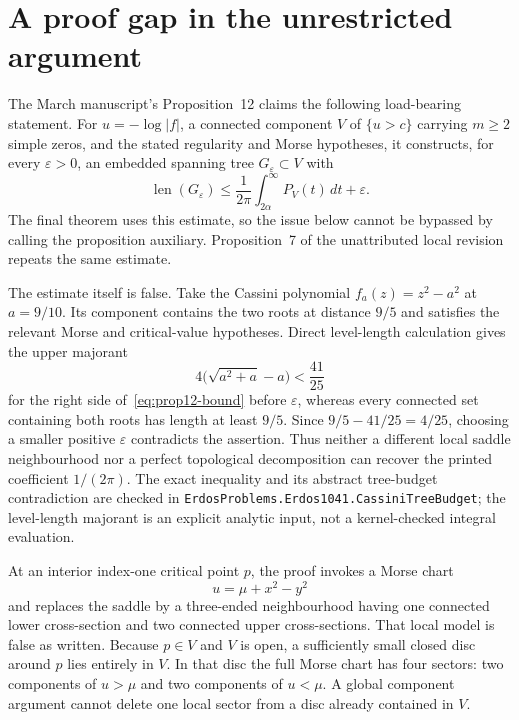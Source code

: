 \documentclass[11pt]{article}
\begin{document}
\section{A proof gap in the unrestricted argument}\label{sec:gap}

The March manuscript's Proposition~12 claims the following load-bearing
statement.  For $u=-\log|f|$, a connected component $V$ of $\{u>c\}$ carrying
$m\ge2$ simple zeros, and the stated regularity and Morse hypotheses, it
constructs, for every $\varepsilon>0$, an embedded spanning tree
$G_\varepsilon\subset V$ with
\[
 \operatorname{len}(G_\varepsilon)
 \le\frac1{2\pi}\int_{2\alpha}^{\infty}P_V(t)\,dt+\varepsilon.
\tag{5.1}\label{eq:prop12-bound}
\]
The final theorem uses this estimate, so the issue below cannot be bypassed by
calling the proposition auxiliary.  Proposition~7 of the unattributed local
revision repeats the same estimate.

The estimate itself is false.  Take the Cassini polynomial
$f_a(z)=z^2-a^2$ at $a=9/10$.  Its component contains the two roots at distance
$9/5$ and satisfies the relevant Morse and critical-value hypotheses.  Direct
level-length calculation gives the upper majorant
\[
  4\bigl(\sqrt{a^2+a}-a\bigr)<\frac{41}{25}
\]
for the right side of~\eqref{eq:prop12-bound} before $\varepsilon$, whereas
every connected set containing both roots has length at least $9/5$.  Since
$9/5-41/25=4/25$, choosing a smaller positive $\varepsilon$ contradicts the
assertion.  Thus neither a different local saddle neighbourhood nor a perfect
topological decomposition can recover the printed coefficient $1/(2\pi)$.
The exact inequality and its abstract tree-budget contradiction are checked in
\texttt{ErdosProblems.Erdos1041.CassiniTreeBudget}; the level-length majorant is
an explicit analytic input, not a kernel-checked integral evaluation.

At an interior index-one critical point $p$, the proof invokes a Morse chart
\[
 u=\mu+x^2-y^2
\]
and replaces the saddle by a three-ended neighbourhood having one connected
lower cross-section and two connected upper cross-sections.  That local model
is false as written.  Because $p\in V$ and $V$ is open, a sufficiently small
closed disc around $p$ lies entirely in $V$.  In that disc the full Morse chart
has four sectors: two components of $u>\mu$ and two components of $u<\mu$.
A global component argument cannot delete one local sector from a disc already
contained in $V$.
\end{document}
